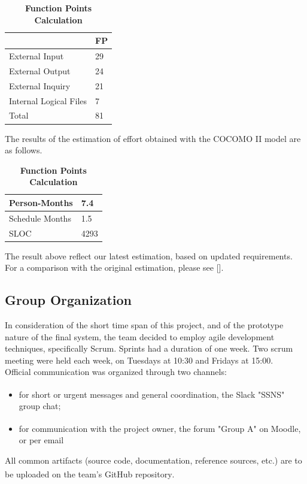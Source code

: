 \documentclass[hidelinks,conference,12pt]{IEEETran}
\begin{document}
\FloatBarrier
\begin{table}[h]
	\centering
	\caption{\textbf{Function Points Calculation}}
	{\renewcommand{\arraystretch}{2}%
		\begin{tabular}{|l|p{1cm}|}
			\hline
			 & FP \\
			\hline
			External Input & 29 \\
			\hline
		    External Output & 24 \\
		    \hline 
			External Inquiry & 21 \\
			\hline
			Internal Logical Files & 7 \\
			\hline
			Total & 81 \\
			\hline
	\end{tabular}}
\end{table}
\FloatBarrier

The results of the estimation of effort obtained with the COCOMO II model are as follows.

\FloatBarrier
\begin{table}[h]
	\centering
	\caption{\textbf{Function Points Calculation}}
	{\renewcommand{\arraystretch}{2}%
		\begin{tabular}{|l|p{1cm}|}
			\hline
			Person-Months & 7.4 \\
			\hline
			Schedule Months & 1.5 \\
			\hline
			SLOC & 4293 \\
			\hline 
	\end{tabular}}
\end{table}
\FloatBarrier
The result above reflect our latest estimation, based on updated requirements. For a comparison with the original estimation, please see [].

\subsection{Group Organization}

In consideration of the short time span of this project, and of the prototype nature of the final system, the team decided to employ agile development techniques, specifically Scrum. Sprints had a duration of one week. Two scrum meeting were held each week, on Tuesdays at 10:30 and Fridays at 15:00.\\
Official communication was organized through two channels:
\begin{itemize}
	\item for short or urgent messages and general coordination, the Slack\textsuperscript{\cite{slack}} "SSNS" group chat;
	\item for communication with the project owner, the forum "Group A" on Moodle\textsuperscript{\cite{moodle}}, or per email
\end{itemize}
All common artifacts (source code, documentation, reference sources, etc.) are to be uploaded on the team’s GitHub repository\textsuperscript{\cite{github}}.
\end{document}
